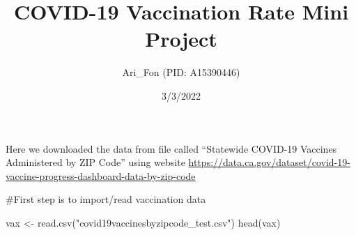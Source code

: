 \documentclass[
]{article}
\title{COVID-19 Vaccination Rate Mini Project}
\author{Ari\_Fon (PID: A15390446)}
\date{3/3/2022}
\newenvironment{Shaded}{\begin{snugshade}}{\end{snugshade}}
\newcommand{\FunctionTok}[1]{\textcolor[rgb]{0.00,0.00,0.00}{#1}}
\newcommand{\NormalTok}[1]{#1}
\newcommand{\OtherTok}[1]{\textcolor[rgb]{0.56,0.35,0.01}{#1}}
\newcommand{\StringTok}[1]{\textcolor[rgb]{0.31,0.60,0.02}{#1}}
\begin{document}
\maketitle

Here we downloaded the data from file called ``Statewide COVID-19
Vaccines Administered by ZIP Code'' using website
\url{https://data.ca.gov/dataset/covid-19-vaccine-progress-dashboard-data-by-zip-code}

\#First step is to import/read vaccination data

\begin{Shaded}
\begin{Highlighting}[]
\NormalTok{vax }\OtherTok{\textless{}{-}} \FunctionTok{read.csv}\NormalTok{(}\StringTok{"covid19vaccinesbyzipcode\_test.csv"}\NormalTok{)}
\FunctionTok{head}\NormalTok{(vax)}
\end{Highlighting}
\end{Shaded}
\end{document}
